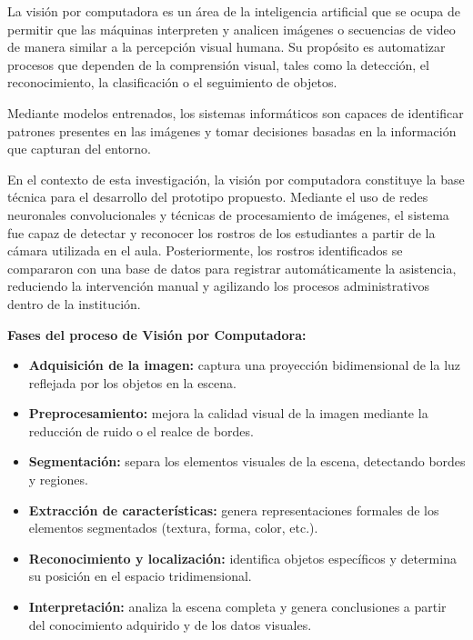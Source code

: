 La visión por computadora es un área de la inteligencia artificial que se ocupa de permitir que las máquinas interpreten y analicen imágenes o secuencias de video de manera similar a la percepción visual humana. Su propósito es automatizar procesos que dependen de la comprensión visual, tales como la detección, el reconocimiento, la clasificación o el seguimiento de objetos.

Mediante modelos entrenados, los sistemas informáticos son capaces de identificar patrones presentes en las imágenes y tomar decisiones basadas en la información que capturan del entorno\cite{mora2002,recfacesVisionComputadora}.

En el contexto de esta investigación, la visión por computadora constituye la base técnica para el desarrollo del prototipo propuesto. Mediante el uso de redes neuronales convolucionales y técnicas de procesamiento de imágenes, el sistema fue capaz de detectar y reconocer los rostros de los estudiantes a partir de la cámara utilizada en el aula. Posteriormente, los rostros identificados se compararon con una base de datos para registrar automáticamente la asistencia, reduciendo la intervención manual y agilizando los procesos administrativos dentro de la institución.

\textbf{Fases del proceso de Visión por Computadora:}

\begin{itemize}
  \item \textbf{Adquisición de la imagen:} captura una proyección bidimensional de la luz reflejada por los objetos en la escena.

  \item \textbf{Preprocesamiento:} mejora la calidad visual de la imagen mediante la reducción de ruido o el realce de bordes.

  \item \textbf{Segmentación:} separa los elementos visuales de la escena, detectando bordes y regiones.

  \item \textbf{Extracción de características:} genera representaciones formales de los elementos segmentados (textura, forma, color, etc.).

  \item \textbf{Reconocimiento y localización:} identifica objetos específicos y determina su posición en el espacio tridimensional.

  \item \textbf{Interpretación:} analiza la escena completa y genera conclusiones a partir del conocimiento adquirido y de los datos visuales.
\end{itemize}


